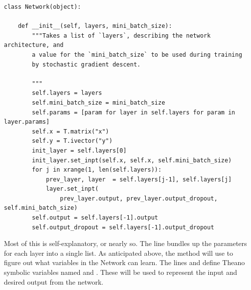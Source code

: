 \documentclass[a4paper,twoside,10pt]{book}
\begin{document}
\begin{lstlisting}
class Network(object):

    def __init__(self, layers, mini_batch_size):
        """Takes a list of `layers`, describing the network architecture, and
        a value for the `mini_batch_size` to be used during training
        by stochastic gradient descent.

        """
        self.layers = layers
        self.mini_batch_size = mini_batch_size
        self.params = [param for layer in self.layers for param in layer.params]
        self.x = T.matrix("x")
        self.y = T.ivector("y")
        init_layer = self.layers[0]
        init_layer.set_inpt(self.x, self.x, self.mini_batch_size)
        for j in xrange(1, len(self.layers)):
            prev_layer, layer  = self.layers[j-1], self.layers[j]
            layer.set_inpt(
                prev_layer.output, prev_layer.output_dropout, self.mini_batch_size)
        self.output = self.layers[-1].output
        self.output_dropout = self.layers[-1].output_dropout
\end{lstlisting}
Most of this is self-explanatory, or nearly so. The line  bundles up the parameters for each layer into a single list. As anticipated above, the  method will use  to figure out what variables in the Network can learn. The lines  and  define Theano symbolic variables named  and . These will be used to represent the input and desired output from the network.
\end{document}

